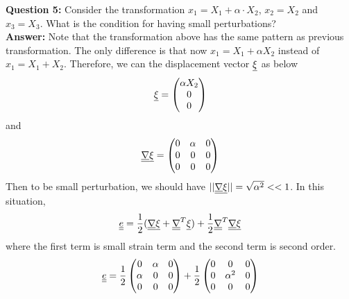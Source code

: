 \documentclass[letter,12pt]{article}
\begin{document}
	\noindent \textbf{Question 5:} Consider the transformation $x_1=X_1+\alpha \cdot X_2$, $x_2=X_2$ and $x_3=X_3$. What is the condition for having small perturbations? \\
	
	\textbf{Answer:} Note that the transformation above has the same pattern as previous transformation. The only difference is that now $x_1 = X_1 + \alpha X_2$ instead of $x_1 = X_1 + X_2$. Therefore, we can the displacement vector $\underline{\xi}$ as below
	\begin{equation}
	\underline{\xi} = \left( \begin{matrix}
	\alpha X_2 \\ 0 \\ 0
	\end{matrix} \right)
	\end{equation}
	and 
	\begin{equation}
	\underline{\underline{\nabla}} \underline{\xi} = \left( \begin{matrix}
	0 & \alpha & 0 \\
	0 & 0 & 0 \\
	0 & 0 & 0
	\end{matrix} \right)
	\end{equation}
	Then to be small perturbation, we should have $||\underline{\underline{\nabla}} \underline{\xi} || = \sqrt{\alpha^2} << 1$. In this situation,
	\begin{equation}
	\underline{\underline{e}} = \frac{1}{2}(\underline{\underline{\nabla}} \underline{\xi} + \underline{\underline{\nabla}}^T \underline{\xi}) + \frac{1}{2} \underline{\underline{\nabla}}^T \underline{\underline{\nabla}} \underline{\xi}
	\end{equation}
	where the first term is small strain term and the second term is second order.
	\begin{equation}
	\underline{\underline{e}} = \frac{1}{2} \left( \begin{matrix}
	0 & \alpha & 0 \\
	\alpha & 0 & 0 \\
	0 & 0 & 0
	\end{matrix}\right) + \frac{1}{2} \left(
	\begin{matrix}
	0 & 0 & 0 \\
	0 & \alpha^2 & 0 \\
	0 & 0 & 0
	\end{matrix} \right)
	\end{equation}
	
 
\end{document}
